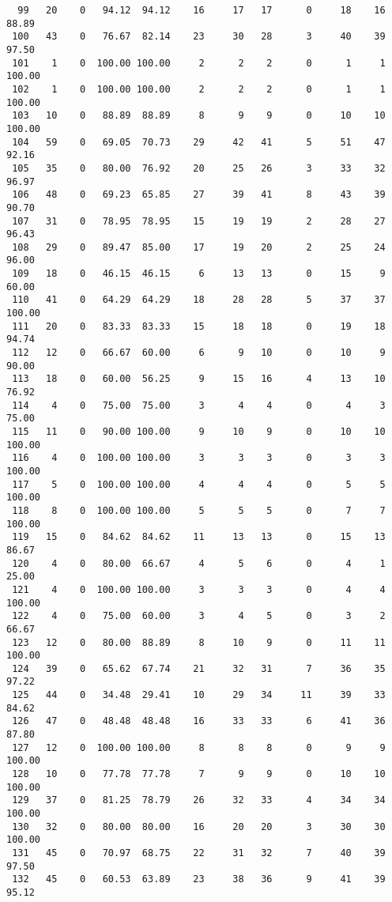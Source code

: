 \begin{verbatim}
  99   20    0   94.12  94.12    16     17   17      0     18    16    88.89
 100   43    0   76.67  82.14    23     30   28      3     40    39    97.50
 101    1    0  100.00 100.00     2      2    2      0      1     1   100.00
 102    1    0  100.00 100.00     2      2    2      0      1     1   100.00
 103   10    0   88.89  88.89     8      9    9      0     10    10   100.00
 104   59    0   69.05  70.73    29     42   41      5     51    47    92.16
 105   35    0   80.00  76.92    20     25   26      3     33    32    96.97
 106   48    0   69.23  65.85    27     39   41      8     43    39    90.70
 107   31    0   78.95  78.95    15     19   19      2     28    27    96.43
 108   29    0   89.47  85.00    17     19   20      2     25    24    96.00
 109   18    0   46.15  46.15     6     13   13      0     15     9    60.00
 110   41    0   64.29  64.29    18     28   28      5     37    37   100.00
 111   20    0   83.33  83.33    15     18   18      0     19    18    94.74
 112   12    0   66.67  60.00     6      9   10      0     10     9    90.00
 113   18    0   60.00  56.25     9     15   16      4     13    10    76.92
 114    4    0   75.00  75.00     3      4    4      0      4     3    75.00
 115   11    0   90.00 100.00     9     10    9      0     10    10   100.00
 116    4    0  100.00 100.00     3      3    3      0      3     3   100.00
 117    5    0  100.00 100.00     4      4    4      0      5     5   100.00
 118    8    0  100.00 100.00     5      5    5      0      7     7   100.00
 119   15    0   84.62  84.62    11     13   13      0     15    13    86.67
 120    4    0   80.00  66.67     4      5    6      0      4     1    25.00
 121    4    0  100.00 100.00     3      3    3      0      4     4   100.00
 122    4    0   75.00  60.00     3      4    5      0      3     2    66.67
 123   12    0   80.00  88.89     8     10    9      0     11    11   100.00
 124   39    0   65.62  67.74    21     32   31      7     36    35    97.22
 125   44    0   34.48  29.41    10     29   34     11     39    33    84.62
 126   47    0   48.48  48.48    16     33   33      6     41    36    87.80
 127   12    0  100.00 100.00     8      8    8      0      9     9   100.00
 128   10    0   77.78  77.78     7      9    9      0     10    10   100.00
 129   37    0   81.25  78.79    26     32   33      4     34    34   100.00
 130   32    0   80.00  80.00    16     20   20      3     30    30   100.00
 131   45    0   70.97  68.75    22     31   32      7     40    39    97.50
 132   45    0   60.53  63.89    23     38   36      9     41    39    95.12

\end{verbatim}
